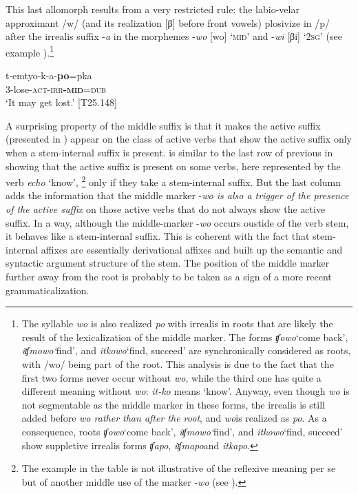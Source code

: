 \documentclass[output=paper]{langscibook}
\begin{document}
This last allomorph results from a very restricted rule: the labio-velar approximant /w/ (and its realization [β] before front vowels) plosivize in /p/ after the irrealis suffix -\textit{a} in the morphemes -\textit{wo} [wo] ‘\textsc{mid}’ and -\textit{wi} [βi] ‘2\textsc{sg}’ (see example ).\footnote{The syllable \textit{wo} is also realized \textit{po} with irrealis in roots that are likely the result of the lexicalization of the middle marker. The forms \textit{ʧowo}\textrm{}‘come back’, \textit{iʧmowo}\textrm{}\textit{\textup{‘}}find’, and \textit{itkowo}\textrm{}‘find, succeed’ are synchronically considered as roots, with /wo/ being part of the root. This analysis is due to the fact that the first two forms never occur without \textit{wo}, while the third one has quite a different meaning without \textit{wo}: \textit{it-ko} means ‘know’. Anyway, even though \textit{wo} is not segmentable as the middle marker in these forms, the irrealis is still added before \textit{wo \textup{rather than after the root}}, and \textit{wo}\textrm{}is realized as \textit{po}. As a consequence, roots \textit{ʧowo}\textrm{}‘come back’, \textit{iʧmowo}\textrm{}\textit{\textup{‘}}find’, and \textit{itkowo}\textrm{}‘find, succeed’ show suppletive irrealis forms \textit{ʧapo}, \textit{iʧmapo}\textrm{}and \textit{itkapo}.}


\ea
\label{ex:Rose:11}
\gll t-emtyo-k-a-\textbf{po}=pka\\
3-lose-\textsc{act-irr\textbf{-mid}=dub}\\
\glt ‘It may get lost.’ [T25.148]
\z



A surprising property of the middle suffix is that it makes the active suffix (presented in ) appear on the class of active verbs that show the active suffix only when a stem-internal suffix is present.  is similar to the last row of previous  in showing that the active suffix is present on some verbs, here represented by the verb \textit{echo} ‘know’, \footnote{The example in the table is not illustrative of the reflexive meaning per se but of another middle use of the marker -\textit{wo} (see ).} only if they take a stem-internal suffix. But the last column adds the information that the middle marker -\textit{wo \textup{is also a trigger of the presence of the active suffix}} on those active verbs that do not always show the active suffix. In a way, although the middle-marker -\textit{wo} occurs oustide of the verb stem, it behaves like a stem-internal suffix. This is coherent with the fact that stem-internal affixes are essentially derivational affixes and built up the semantic and syntactic argument structure of the stem. The position of the middle marker further away from the root is probably to be taken as a sign of a more recent grammaticalization.
\end{document}
